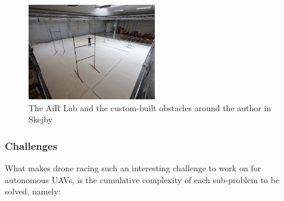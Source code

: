 \begin{figure}[h]
	\centering
	\includegraphics[width=0.5\textwidth]{figure/tiny_me.jpg}
	\caption{The AiR Lab and the custom-built obstacles around the author in Skejby}
	\label{fig:mygates}
\end{figure}

\subsubsection{Challenges}

What makes drone racing such an interesting challenge to work on for autonomous
UAVs, is the cumulative complexity of each sub-problem to be solved, namely:

